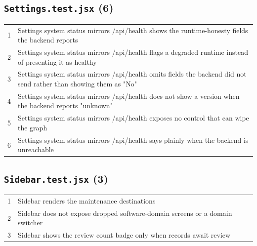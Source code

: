 \subsection*{\texttt{Settings.test.jsx} (6)}
\begin{longtable}{p{}p{}}
1 & Settings system status mirrors /api/health shows the runtime-honesty fields the backend reports \\
2 & Settings system status mirrors /api/health flags a degraded runtime instead of presenting it as healthy \\
3 & Settings system status mirrors /api/health omits fields the backend did not send rather than showing them as "No" \\
4 & Settings system status mirrors /api/health does not show a version when the backend reports "unknown" \\
5 & Settings system status mirrors /api/health exposes no control that can wipe the graph \\
6 & Settings system status mirrors /api/health says plainly when the backend is unreachable \\
\end{longtable}
\subsection*{\texttt{Sidebar.test.jsx} (3)}
\begin{longtable}{p{}p{}}
1 & Sidebar renders the maintenance destinations \\
2 & Sidebar does not expose dropped software-domain screens or a domain switcher \\
3 & Sidebar shows the review count badge only when records await review \\
\end{longtable}
